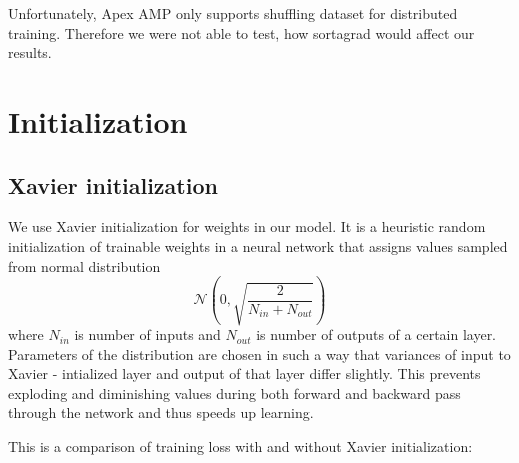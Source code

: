 \documentclass[licencjacka,en]{pracamgr}
\begin{document}
Unfortunately, Apex AMP only supports shuffling dataset for distributed training. Therefore we were not able to test, how sortagrad would affect our results.

\section{Initialization}
\xavier

\subsection{Xavier initialization}
We use Xavier initialization \cite{XAVIER} for weights in our model. It is a heuristic random initialization of trainable weights in a neural network that assigns values sampled from normal distribution $$\mathcal{N}\left(0, \sqrt{\frac{2}{N_{in} + N_{out}}}\right)$$ where $N_{in}$ is number of inputs and $N_{out}$ is number of outputs of a certain layer. Parameters of the distribution are chosen in such a way that variances of input to Xavier - intialized layer and output of that layer differ slightly. This prevents exploding and diminishing values during both forward and backward pass through the network and thus speeds up learning.

This is a comparison of training loss with and without Xavier initialization:
\end{document}
